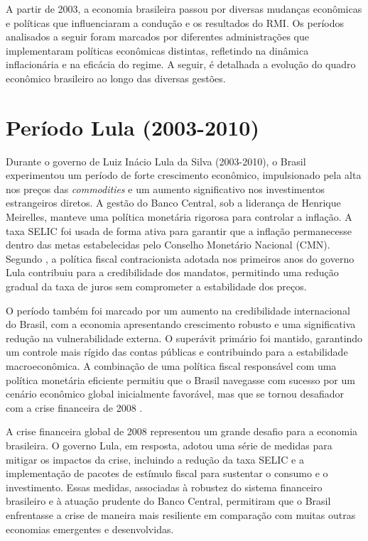 \documentclass[12pt,oneside,a4paper,chapter=TITLE,english,brazil,sumario=abnt-6027-2012]{abntex2}
\begin{document}
A partir de 2003, a economia brasileira passou por diversas mudanças econômicas e políticas que influenciaram a condução e os resultados do RMI. Os períodos analisados a seguir foram marcados por diferentes administrações que implementaram políticas econômicas distintas, refletindo na dinâmica inflacionária e na eficácia do regime. A seguir, é detalhada a evolução do quadro econômico brasileiro ao longo das diversas gestões.

\section{Período Lula (2003-2010)}

Durante o governo de Luiz Inácio Lula da Silva (2003-2010), o Brasil experimentou um período de forte crescimento econômico, impulsionado pela alta nos preços das \textit{commodities} e um aumento significativo nos investimentos estrangeiros diretos. A gestão do Banco Central, sob a liderança de Henrique Meirelles, manteve uma política monetária rigorosa para controlar a inflação. A taxa SELIC foi usada de forma ativa para garantir que a inflação permanecesse dentro das metas estabelecidas pelo Conselho Monetário Nacional (CMN). Segundo , a política fiscal contracionista adotada nos primeiros anos do governo Lula contribuiu para a credibilidade dos mandatos, permitindo uma redução gradual da taxa de juros sem comprometer a estabilidade dos preços.

O período também foi marcado por um aumento na credibilidade internacional do Brasil, com a economia apresentando crescimento robusto e uma significativa redução na vulnerabilidade externa. O superávit primário foi mantido, garantindo um controle mais rígido das contas públicas e contribuindo para a estabilidade macroeconômica. A combinação de uma política fiscal responsável com uma política monetária eficiente permitiu que o Brasil navegasse com sucesso por um cenário econômico global inicialmente favorável, mas que se tornou desafiador com a crise financeira de 2008 \cite{fabiogiambiagi_2016_economia}.

A crise financeira global de 2008 representou um grande desafio para a economia brasileira. O governo Lula, em resposta, adotou uma série de medidas para mitigar os impactos da crise, incluindo a redução da taxa SELIC e a implementação de pacotes de estímulo fiscal para sustentar o consumo e o investimento. Essas medidas, associadas à robustez do sistema financeiro brasileiro e à atuação prudente do Banco Central, permitiram que o Brasil enfrentasse a crise de maneira mais resiliente em comparação com muitas outras economias emergentes e desenvolvidas.
\end{document}

